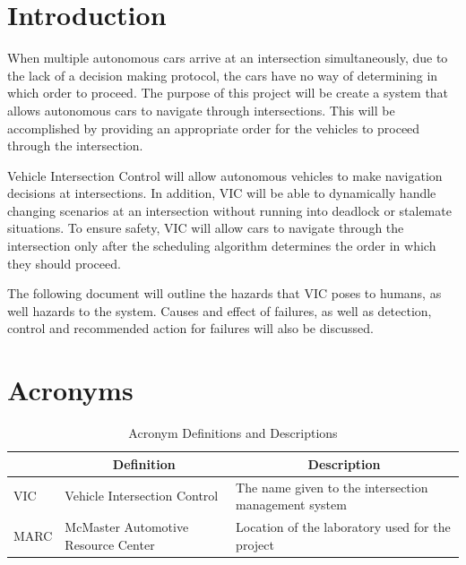 \documentclass [10pt]{article}
\begin{document}

\section {Introduction}


When multiple autonomous cars arrive at an intersection simultaneously, due to the lack of a decision making protocol, the cars have no way of determining in which order to proceed. The purpose of this project will be create a system that allows autonomous cars to navigate through  intersections. This will be accomplished by providing an appropriate order for the vehicles to proceed through the intersection.  \newline


Vehicle Intersection Control will allow autonomous vehicles to make navigation decisions at intersections. In addition, VIC will be able to dynamically handle changing scenarios at an intersection without running into deadlock or stalemate situations. To ensure safety, VIC will allow cars to navigate through the intersection only after the scheduling algorithm determines the order in which they should proceed. \newline

The following document will outline the hazards that VIC poses to humans, as well hazards to the system. Causes and effect of failures, as well as detection, control and recommended action for failures will also be discussed. 

\section{Acronyms}
\begin{longtable}{|p{}|p{}|p{}|}  \caption{Acronym Definitions and Descriptions } \\ \hline
\rowcolor{subsectionC}\multicolumn{1}{|c|}{\textbf{Acronym}} & \multicolumn{1}{c}{\textbf{Definition}}& \multicolumn{1}{|c|}{\textbf{Description}} \\ \hline
\rowcolor{tableCell}VIC &Vehicle Intersection Control & The name given to the intersection management system\\ \hline
MARC & McMaster Automotive Resource Center & Location of the laboratory used for the project\\ \hline

\end{longtable}
\end{document}
